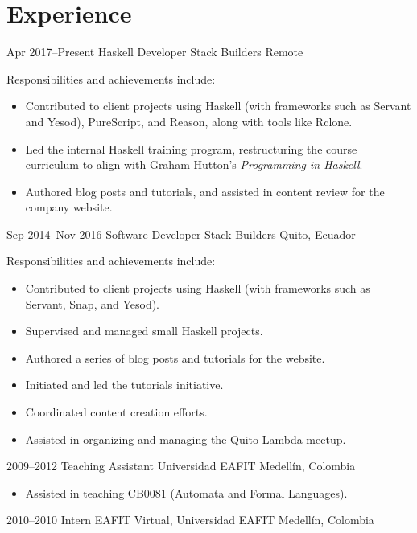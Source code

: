 \documentclass[letterpaper,sans,12pt]{moderncv}
\begin{document}
\makecvtitle

\section{Experience}

\cventry
  {Apr 2017--Present}
  {Haskell Developer}
  {Stack Builders}
  {Remote}
  {}
  {
    Responsibilities and achievements include:
    \begin{itemize}
      \item
        Contributed to client projects using Haskell (with frameworks
        such as Servant and Yesod), PureScript, and Reason, along with
        tools like Rclone.
      \item
        Led the internal Haskell training program, restructuring the
        course curriculum to align with Graham Hutton's
        \textit{Programming in Haskell}.
      \item
        Authored blog posts and tutorials, and assisted in content
        review for the company website.
    \end{itemize}
  }
\cventry
  {Sep 2014--Nov 2016}
  {Software Developer}
  {Stack Builders}
  {Quito, Ecuador}
  {}
  {
    Responsibilities and achievements include:
    \begin{itemize}
      \item
        Contributed to client projects using Haskell (with frameworks
        such as Servant, Snap, and Yesod).
      \item
        Supervised and managed small Haskell projects.
      \item
        Authored a series of blog posts and tutorials for the website.
      \item
        Initiated and led the tutorials initiative.
      \item
        Coordinated content creation efforts.
      \item
        Assisted in organizing and managing the Quito Lambda meetup.
    \end{itemize}
  }
\cventry
  {2009--2012}
  {Teaching Assistant}
  {Universidad EAFIT}
  {Medellín, Colombia}
  {}
  {
    \begin{itemize}
      \item
        Assisted in teaching CB0081 (Automata and Formal Languages).
    \end{itemize}
  }
\cventry
  {2010--2010}
  {Intern}
  {EAFIT Virtual, Universidad EAFIT}
  {Medellín, Colombia}
  {}
  {}
\end{document}
